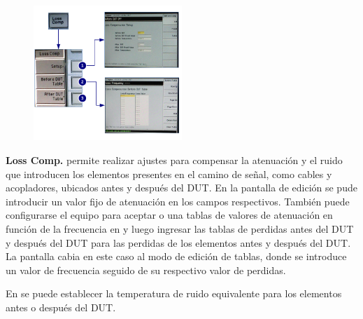 	\begin{minipage}[t]{\textwidth}
		\begin{figure}	
			\centering	
			\includegraphics[width=0.5\textwidth]{Imagenes/MenuLossCompN8975A.pdf}	
		\end{figure}
		
		\textbf{Loss Comp.} permite realizar ajustes para compensar la atenuación y el ruido que	introducen los elementos presentes en el camino de señal, como cables y acopladores, ubicados antes y después del DUT. En la pantalla de edición se pude introducir un valor fijo de atenuación en los campos respectivos. También puede configurarse el equipo para aceptar o una tablas de valores de atenuación en función de la frecuencia en y luego ingresar las tablas de perdidas antes del DUT y después del DUT para las perdidas de los elementos antes y después del DUT. La pantalla cabia en este caso al modo de edición de tablas, donde se introduce un valor de frecuencia seguido de	su respectivo valor de perdidas.
		
		En se puede establecer la temperatura de ruido equivalente para los elementos antes o después del DUT. 
	\end{minipage}
	
